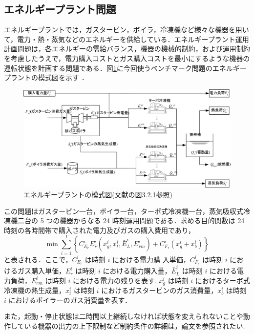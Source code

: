 \documentclass[twocolumn]{jarticle}
\begin{document}
    \subsection{エネルギープラント問題}
    エネルギープラントでは，ガスタービン，ボイラ，冷凍機など様々な機器を用いて，電力・熱・蒸気などのエネルギーを供給している．エネルギープラント運用計画問題は，各エネルギーの需給バランス，機器の機械的制約，および運用制約を考慮したうえで，電力購入コストとガス購入コストを最小にするような機器の運転状態を計画する問題である．図\ref{energy_plant}に今回使うベンチマーク問題のエネルギープラントの模式図を示す \cite{denki}．
    \begin{figure}[hbtp]
        \centering
        \includegraphics[keepaspectratio, scale=1.0]
            {energy_plant.png}
        \caption{エネルギープラントの模式図(文献\cite{denki}の図3.2.1参照)}
        \label{energy_plant}
       \end{figure}
    この問題はガスタービン一台，ボイラ一台，ターボ式冷凍機一台，蒸気吸収式冷凍機二台の 5 つの機器からなる 24 時刻運用問題である．求める目的関数は 24 時刻の各時間帯で購入された電力及びガスの購入費用であり，
    \begin{equation}
        \label{fitness}
        \min\sum_{i=1}^I\left\{C_{E_r}^iE_r^i(x_g^i, x_t^i, \bar{E}_L^i, E_{rm}^i) + C_{F_r}^i(x_g^i + x_b^i)\right\}
    \end{equation}
    と表される．ここで，$C_{E_r}^i$ は時刻 $i$ における電力購 入単価，$C_{F_r}^i$ は時刻 $i$ におけるガス購入単価，$E_r^i$ は時刻 $i$ における電力購入量，$\bar{E}_L^i$ は時刻 $i$ における電 力負荷，$E_{rm}^i$ は時刻 $i$ における電力の残りを表す. $x_g^i$ は時刻 $i$ におけるターボ式冷凍機の熱生成量，$x_t^i$ は時刻 $i$ におけるガスタービンのガス消費量，$x_b^i$ は時刻 $i$ におけるボイラーのガス消費量を表す．
    
    また，起動・停止状態は二時間以上継続しなければ状態を変えられないことや動作している機器の出力の上下限制など制約条件の詳細は，論文\cite{denki}を参照されたい.
\end{document}
